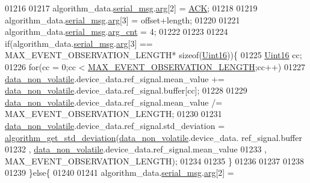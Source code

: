 \begin{DoxyCode}
{{{{{01216 
01217                          algorithm\_data.\hyperlink{a00016_afcf5f557aea688aad985eec15269c1da}{serial\_msg}.\hyperlink{a00031_af7d6f762438c80072bd9dc0e4dd4ae1e}{arg}[2] = \hyperlink{a00021_a6f6489887e08bff4887d0bc5dcf214d8}{ACK};
01218 
01219                          algorithm\_data.\hyperlink{a00016_afcf5f557aea688aad985eec15269c1da}{serial\_msg}.\hyperlink{a00031_af7d6f762438c80072bd9dc0e4dd4ae1e}{arg}[3] = offset+length;
01220 
01221                          algorithm\_data.\hyperlink{a00016_afcf5f557aea688aad985eec15269c1da}{serial\_msg}.\hyperlink{a00031_a7b79f40e2eeec288091afd340bf8f591}{arg\_cnt} = 4;
01222 
01223 
01224                          \textcolor{keywordflow}{if}(algorithm\_data.\hyperlink{a00016_afcf5f557aea688aad985eec15269c1da}{serial\_msg}.\hyperlink{a00031_af7d6f762438c80072bd9dc0e4dd4ae1e}{arg}[3] == MAX\_EVENT\_OBSERVATION\_LENGTH*\textcolor{keyword}{
      sizeof}(\hyperlink{a00072_a59a9f6be4562c327cbfb4f7e8e18f08b}{Uint16}))\{
01225                              \hyperlink{a00072_a59a9f6be4562c327cbfb4f7e8e18f08b}{Uint16} cc;
01226                              \textcolor{keywordflow}{for}(cc = 0;cc < \hyperlink{a00022_aa060aeb1ecb530b3c6f6d91060999b70}{MAX\_EVENT\_OBSERVATION\_LENGTH};cc++)
01227                                 \hyperlink{a00060_a76ac5f917f5308dcd83de0d7c94559fb}{data\_non\_volatile}.device\_data.ref\_signal.mean\_value +=
      \hyperlink{a00060_a76ac5f917f5308dcd83de0d7c94559fb}{data\_non\_volatile}.device\_data.ref\_signal.buffer[cc];
01228 
01229                              \hyperlink{a00060_a76ac5f917f5308dcd83de0d7c94559fb}{data\_non\_volatile}.device\_data.ref\_signal.mean\_value    /=
      MAX\_EVENT\_OBSERVATION\_LENGTH;
01230 
01231                              \hyperlink{a00060_a76ac5f917f5308dcd83de0d7c94559fb}{data\_non\_volatile}.device\_data.ref\_signal.std\_deviation = 
      \hyperlink{a00038_a97eb6437dda088f144d791e49cd3dc2a}{algorithm\_get\_std\_deviation}(\hyperlink{a00060_a76ac5f917f5308dcd83de0d7c94559fb}{data\_non\_volatile}.device\_data.
      ref\_signal.buffer
01232                                                                                       ,
      \hyperlink{a00060_a76ac5f917f5308dcd83de0d7c94559fb}{data\_non\_volatile}.device\_data.ref\_signal.mean\_value
01233                                                                                       ,
      MAX\_EVENT\_OBSERVATION\_LENGTH);
01234 
01235                          \}
01236 
01237 
01238 
01239                      \}\textcolor{keywordflow}{else}\{
01240 
01241                          algorithm\_data.\hyperlink{a00016_afcf5f557aea688aad985eec15269c1da}{serial\_msg}.\hyperlink{a00031_af7d6f762438c80072bd9dc0e4dd4ae1e}{arg}[2] = 
}}}}}
\end{DoxyCode}
